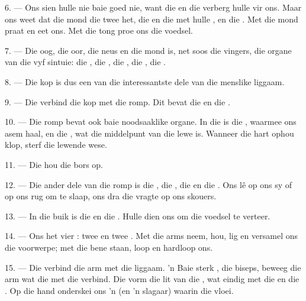 6. --- Ons sien hulle nie baie goed nie, want die  en die
 verberg hulle vir ons. Maar ons weet dat die mond die twee
 het, die  en die  met hulle
, en die . Met die mond praat en eet ons. Met die tong proe
ons die voedsel.

7. --- Die oog, die oor, die neus en die mond is, net soos die vingers, die organe van
die vyf sintuie: die , die , die , die
, die .

8. --- Die kop is dus een van die interessantste dele van die menslike liggaam.

\VUsaut{4.4mm}
\VUsaut{3.0mm}

9. --- Die  verbind die kop met die romp. Dit bevat die  en
die .

10. --- Die romp bevat ook baie noodsaaklike organe. In die  is die
, waarmee ons asem haal, en die , wat die middelpunt van die
lewe is. Wanneer die hart ophou klop, sterf die lewende wese.

11. --- Die  hou die bors op.

12. --- Die ander dele van die romp is die , die , die
 en die . Ons lê op ons sy of op ons rug om te slaap, ons
dra die vragte op ons skouers.

13. --- In die buik is die  en die . Hulle dien ons om
die voedsel te verteer.

\VUsaut{4.4mm}
\VUsaut{3.0mm}

14. --- Ons het vier : twee  en twee . Met
die arms neem, hou, lig en versamel ons die voorwerpe; met die bene staan, loop en hardloop
ons.

15. --- Die  verbind die arm met die liggaam. 'n Baie sterk
, die biseps, beweeg die arm wat die  met die
 verbind. Die  vorm die lit van die , wat
eindig met die  en die . Op die hand onderskei ons 'n
 (en 'n slagaar) waarin die  vloei.

